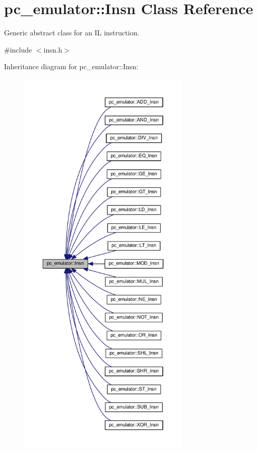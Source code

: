 \hypertarget{classpc__emulator_1_1Insn}{}\section{pc\+\_\+emulator\+:\+:Insn Class Reference}
\label{classpc__emulator_1_1Insn}


Generic abstract class for an IL instruction.  




{\ttfamily \#include $<$insn.\+h$>$}



Inheritance diagram for pc\+\_\+emulator\+:\+:Insn\+:\nopagebreak
\begin{figure}[H]
\begin{center}
\leavevmode
\includegraphics[height=550pt]{classpc__emulator_1_1Insn__inherit__graph}
\end{center}
\end{figure}


